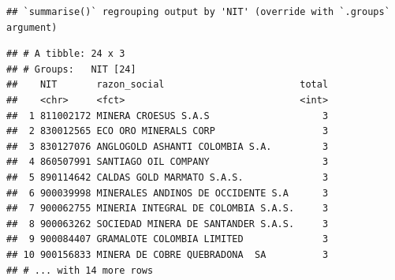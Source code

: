 \documentclass[
  11pt,
]{book}
\newenvironment{Shaded}{\begin{snugshade}}{\end{snugshade}}
\newcommand{\DataTypeTok}[1]{\textcolor[rgb]{0.13,0.29,0.53}{#1}}
\newcommand{\DecValTok}[1]{\textcolor[rgb]{0.00,0.00,0.81}{#1}}
\newcommand{\KeywordTok}[1]{\textcolor[rgb]{0.13,0.29,0.53}{\textbf{#1}}}
\newcommand{\NormalTok}[1]{#1}
\newcommand{\OperatorTok}[1]{\textcolor[rgb]{0.81,0.36,0.00}{\textbf{#1}}}
\newcommand{\StringTok}[1]{\textcolor[rgb]{0.31,0.60,0.02}{#1}}
\begin{document}
\begin{verbatim}
## `summarise()` regrouping output by 'NIT' (override with `.groups` argument)
\end{verbatim}

\begin{verbatim}
## # A tibble: 24 x 3
## # Groups:   NIT [24]
##    NIT       razon_social                        total
##    <chr>     <fct>                               <int>
##  1 811002172 MINERA CROESUS S.A.S                    3
##  2 830012565 ECO ORO MINERALS CORP                   3
##  3 830127076 ANGLOGOLD ASHANTI COLOMBIA S.A.         3
##  4 860507991 SANTIAGO OIL COMPANY                    3
##  5 890114642 CALDAS GOLD MARMATO S.A.S.              3
##  6 900039998 MINERALES ANDINOS DE OCCIDENTE S.A      3
##  7 900062755 MINERIA INTEGRAL DE COLOMBIA S.A.S.     3
##  8 900063262 SOCIEDAD MINERA DE SANTANDER S.A.S.     3
##  9 900084407 GRAMALOTE COLOMBIA LIMITED              3
## 10 900156833 MINERA DE COBRE QUEBRADONA  SA          3
## # ... with 14 more rows
\end{verbatim}

\begin{Shaded}
\end{Shaded}
\end{document}
